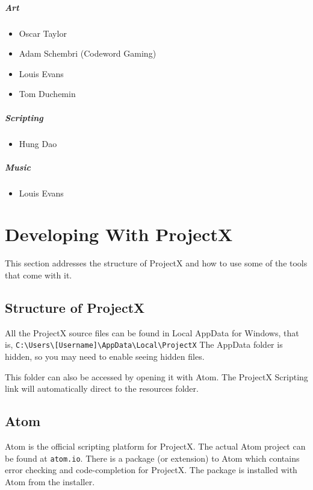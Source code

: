 \documentclass{book}
\begin{document}
	\paragraph{Art}
	\begin{itemize}
		\item Oscar Taylor
		\item Adam Schembri (Codeword Gaming)
		\item Louis Evans
		\item Tom Duchemin
	\end{itemize}
	
	\paragraph{Scripting}
	\begin{itemize}
		\item Hung Dao
	\end{itemize}
	
	\paragraph{Music}
	\begin{itemize}
		\item Louis Evans
	\end{itemize}
	
	\chapter{Developing With ProjectX}
	This section addresses the structure of ProjectX and how to use some of the tools that come with it.
	
	\section{Structure of ProjectX}
	All the ProjectX source files can be found in Local AppData for Windows, that is, \texttt{C:\textbackslash Users\textbackslash [Username]\textbackslash AppData\textbackslash Local\textbackslash ProjectX} The AppData folder is hidden, so you may need to enable seeing hidden files.
	
	This folder can also be accessed by opening it with Atom. The ProjectX Scripting link will automatically direct to the resources folder.
	
	\section{Atom}
	Atom is the official scripting platform for ProjectX. The actual Atom project can be found at \texttt{atom.io}. There is a package (or extension) to Atom which contains error checking and code-completion for ProjectX. The package is installed with Atom from the installer.
	
\end{document}
